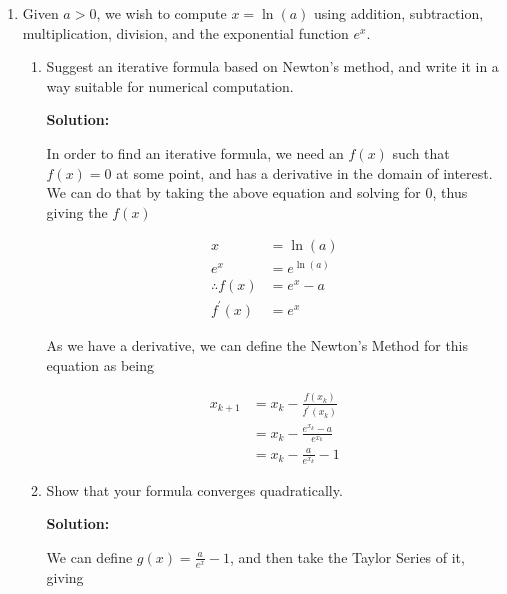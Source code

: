 \documentclass[12pt]{article}
\begin{document}
\begin{enumerate}
\item Given $a > 0$, we wish to compute $x = \ln (a)$ using addition, subtraction, multiplication,
division, and the exponential function $e^{x}$.
\begin{enumerate}
\item Suggest an iterative formula based on Newton's method, and write it in a way suitable
for numerical computation.

{\bf Solution:}

In order to find an iterative formula, we need an $f(x)$ such that $f(x) = 0$ at some point,
and has a derivative in the domain of interest. We can do that by taking the above equation and solving for 0, thus giving the $f(x)$

\begin{align*}
x &= \ln(a)\\
e^{x} &= e^{\ln (a)}\\
\therefore f(x) &= e^{x} - a\\
f^{\prime}(x) &= e^{x}
\end{align*}

As we have a derivative, we can define the Newton's Method for this equation as being

\begin{align*}
x_{k+1} &= x_{k} - \frac{f(x_{k})}{f^{\prime}(x_{k})}\\
        &= x_{k} - \frac{e^{x_{k}} - a}{e^{x_{k}}}\\
        &= x_{k} - \frac{a}{e^{x_{k}}} - 1
\end{align*}

\item Show that your formula converges quadratically.

{\bf Solution:}

We can define $g(x) = \frac{a}{e^{x}} - 1$, and then take the Taylor Series of it, giving


\end{enumerate}
\end{enumerate}
\end{document}
